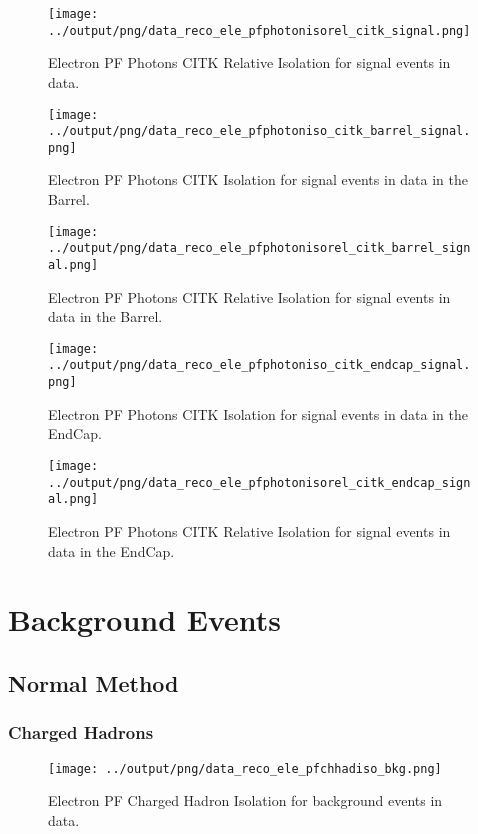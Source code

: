 \documentclass[11pt]{book}
\begin{document}
\begin{figure}[htb]
\centering
\texttt{[image: ../output/png/data\_reco\_ele\_pfphotonisorel\_citk\_signal.png]}
\caption{Electron PF Photons CITK Relative Isolation for signal events in data.}
\label{fig:data_ele_pfphotonsisorel_citk_signal}
\end{figure}

\begin{figure}[htb]
\centering
\texttt{[image: ../output/png/data\_reco\_ele\_pfphotoniso\_citk\_barrel\_signal.png]}
\caption{Electron PF Photons CITK Isolation for signal events in data in the Barrel.}
\label{fig:data_ele_pfphotonsiso_citk_barrel_signal}
\end{figure}

\begin{figure}[htb]
\centering
\texttt{[image: ../output/png/data\_reco\_ele\_pfphotonisorel\_citk\_barrel\_signal.png]}
\caption{Electron PF Photons CITK Relative Isolation for signal events in data in the Barrel.}
\label{fig:data_ele_pfphotonsisorel_citk_barrel_signal}
\end{figure}

\begin{figure}[htb]
\centering
\texttt{[image: ../output/png/data\_reco\_ele\_pfphotoniso\_citk\_endcap\_signal.png]}
\caption{Electron PF Photons CITK Isolation for signal events in data in the EndCap.}
\label{fig:data_ele_pfphotonsiso_citk_endcap_signal}
\end{figure}

\begin{figure}[htb]
\centering
\texttt{[image: ../output/png/data\_reco\_ele\_pfphotonisorel\_citk\_endcap\_signal.png]}
\caption{Electron PF Photons CITK Relative Isolation for signal events in data in the EndCap.}
\label{fig:data_ele_pfphotonsisorel_citk_endcap_signal}
\end{figure}
\clearpage

\chapter{Background Events}
\section{Normal Method}
\subsection{Charged Hadrons}
\begin{figure}[htb]
\centering
\texttt{[image: ../output/png/data\_reco\_ele\_pfchhadiso\_bkg.png]}
\caption{Electron PF Charged Hadron Isolation for background events in data.}
\label{fig:data_ele_pfchhadiso_bkg}
\end{figure}
\end{document}
